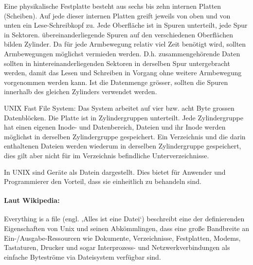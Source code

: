 \begin{answer}
Eine physikalische Festplatte besteht aus sechs bis zehn internen Platten (Scheiben). Auf jede
dieser internen Platten greift jeweils von oben und von unten ein Lese-Schreibkopf zu. Jede
Oberfläche ist in Spuren unterteilt, jede Spur in Sektoren. übereinanderliegende Spuren auf den
verschiedenen Oberflächen bilden Zylinder. Da für jede Armbewegung relativ viel Zeit benötigt
wird, sollten Armbewegungen möglichst vermieden werden. D.h. zusammengehörende Daten sollten
in hintereinanderliegenden Sektoren in derselben Spur untergebracht werden, damit das Lesen
und Schreiben in Vorgang ohne weitere Armbewegung vorgenommen werden kann. Ist die Datenmenge
grösser, sollten die Spuren innerhalb des gleichen Zylinders verwendet werden.

UNIX Fast File System:
Das System arbeitet auf vier bzw. acht Byte grossen Datenblöcken. Die Platte ist in Zylindergruppen unterteilt. Jede Zylindergruppe hat einen eigenen Inode- und Datenbereich, Dateien und ihr Inode werden möglichst in derselben Zylindergruppe gespeichert. Ein Verzeichnis und die darin enthaltenen Dateien werden wiederum in derselben Zylindergruppe gespeichert, dies gilt aber nicht für im Verzeichnis befindliche Unterverzeichnisse.
\end{answer}

\begin{answer}
In UNIX sind Geräte als Datein dargestellt. Dies bietet für Anwender und Programmierer den
Vorteil, dass sie einheitlich zu behandeln sind.

\paragraph*{Laut Wikipedia:}
Everything is a file (engl. ‚Alles ist eine Datei‘) beschreibt eine der definierenden Eigenschaften von Unix und seinen Abkömmlingen, dass eine große Bandbreite an Ein-/Ausgabe-Ressourcen wie Dokumente, Verzeichnisse, Festplatten, Modems, Tastaturen, Drucker und sogar Interprozess- und Netzwerkverbindungen als einfache Byteströme via Dateisystem verfügbar sind.
\end{answer}

